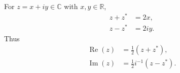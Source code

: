 For $z = x + iy \in \mathbb{C}$ with $x, y \in \mathbb{R}$,
\begin{align*}
z + z^* &= 2x, \\
z - z^* &= 2iy.
\end{align*}
Thus
\begin{align*}
\operatorname{Re}(z) &= \frac{1}{2}(z + z^*), \\
\operatorname{Im}(z) &= \frac{1}{2} i^{-1} (z - z^*).
\end{align*}
